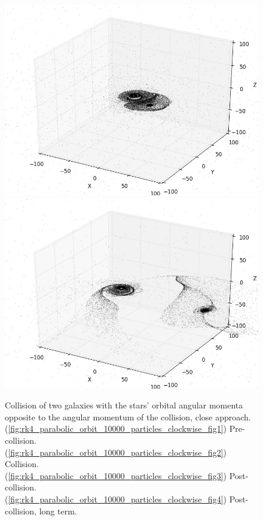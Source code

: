 \documentclass[10pt,letterpaper]{article}
\begin{document}
\begin{figure}[!htb]
  \includegraphics[width=\linewidth]{figures/galaxy_collisions/rk4_parabolic_orbit_10000_particles_clockwise_fig3.png}
  \subcaption{}\label{fig:rk4_parabolic_orbit_10000_particles_clockwise_fig3}
\endminipage
{}%
  \includegraphics[width=\linewidth]{figures/galaxy_collisions/rk4_parabolic_orbit_10000_particles_clockwise_fig4.png}
  \subcaption{}\label{fig:rk4_parabolic_orbit_10000_particles_clockwise_fig4}
\endminipage
\caption{Collision of two galaxies with the stars' orbital angular momenta opposite to the angular momentum of the collision, close approach. (\ref{fig:rk4_parabolic_orbit_10000_particles_clockwise_fig1}) Pre-collision. (\ref{fig:rk4_parabolic_orbit_10000_particles_clockwise_fig2}) Collision. (\ref{fig:rk4_parabolic_orbit_10000_particles_clockwise_fig3}) Post-collision. (\ref{fig:rk4_parabolic_orbit_10000_particles_clockwise_fig4})
Post-collision, long term.}\label{fig:rk4_parabolic_orbit_10000_particles_clockwise}
\end{figure}
\end{document}
